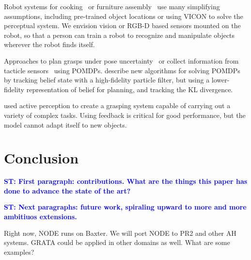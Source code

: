 \documentclass[conference]{IEEEtran}
\newcommand{\stnote}[1]{\textcolor{blue}{\textbf{ST: #1}}}
\begin{document}
Robot systems for cooking~\citep{bollini12, beetz11} or furniture
assembly~\citep{knepper13} use many simplifying assumptions, including
pre-trained object locations or using VICON to solve the perceptual
system.  We envision vision or RGB-D based sensors mounted on the
robot, so that a person can train a robot to recognize and manipulate
objects wherever the robot finds itself.

Approaches to plan grasps under pose uncertainty~\citep{stulp11} or
collect information from tacticle sensors~\citep{hsiao10} using
POMDPs.  \citet{plat11} describe new algorithms for solving POMDPs by
tracking belief state with a high-fidelity particle filter, but using
a lower-fidelity representation of belief for planning, and tracking
the KL divergence.

\citet{hudson12} used active perception to create a grasping system
capable of carrying out a variety of complex tasks.  Using feedback is
critical for good performance, but the model cannot adapt itself to
new objects.



\section{Conclusion}

\stnote{First paragraph:  contributions.  What are the things this paper has done to advance the state of the art?}

\stnote{Next paragraphs: future work, spiraling upward to more and
  more ambitiuos extensions.}

Right now, NODE runs on Baxter. We will port NODE to PR2 and other AH systems.
GRATA could be applied in other domains as well.  What are some examples?


%



\end{document}

